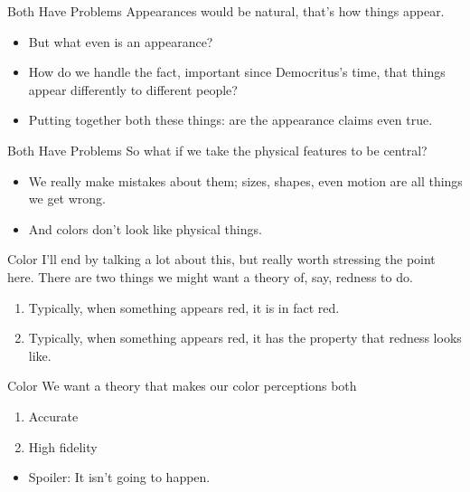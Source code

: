 \documentclass[
  17pt,
  letterpaper,
  ignorenonframetext,
  aspectratio=169,
  handout]{beamer}
\providecommand{\tightlist}{%
  \setlength{\itemsep}{0pt}\setlength{\parskip}{0pt}}\usepackage{longtable,booktabs,array}
\begin{document}
\begin{frame}{Both Have Problems}
\protect\hypertarget{both-have-problems}{}
Appearances would be natural, that's how things appear.

\begin{itemize}[<+->]
\tightlist
\item
  But what even is an appearance?
\item
  How do we handle the fact, important since Democritus's time, that
  things appear differently to different people?
\item
  Putting together both these things: are the appearance claims even
  true.
\end{itemize}
\end{frame}

\begin{frame}{Both Have Problems}
\protect\hypertarget{both-have-problems-1}{}
So what if we take the physical features to be central?

\begin{itemize}[<+->]
\tightlist
\item
  We really make mistakes about them; sizes, shapes, even motion are all
  things we get wrong.
\item
  And colors don't look like physical things.
\end{itemize}
\end{frame}

\begin{frame}{Color}
\protect\hypertarget{color}{}
I'll end by talking a lot about this, but really worth stressing the
point here. There are two things we might want a theory of, say, redness
to do.

\begin{enumerate}[<+->]
\tightlist
\item
  Typically, when something appears red, it is in fact red.
\item
  Typically, when something appears red, it has the property that
  redness looks like.
\end{enumerate}
\end{frame}

\begin{frame}{Color}
\protect\hypertarget{color-1}{}
We want a theory that makes our color perceptions both

\begin{enumerate}[<+->]
\tightlist
\item
  Accurate
\item
  High fidelity
\end{enumerate}

\begin{itemize}[<+->]
\tightlist
\item
  Spoiler: It isn't going to happen.
\end{itemize}
\end{frame}
\end{document}

